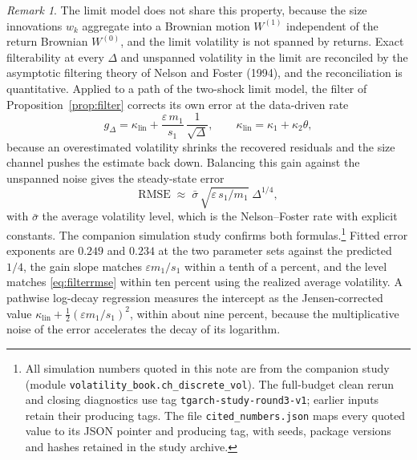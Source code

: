 \documentclass[11pt]{article}
\theoremstyle{remark}
\newtheorem{remark}[theorem]{Remark}
\newcommand{\Dt}{\Delta}
\begin{document}
\begin{remark}\label{rem:filtergap}
The limit model does not share this property, because the size innovations
$w_k$ aggregate into a Brownian motion $W^{(1)}$ independent of the return
Brownian $W^{(0)}$, and the limit volatility is not spanned by returns.
Exact filterability at every $\Dt$ and unspanned volatility in the limit
are reconciled by the asymptotic filtering theory of Nelson and Foster
(1994), and the reconciliation is quantitative.
Applied to a path of the two-shock limit model, the filter of
Proposition~\ref{prop:filter} corrects its own error at the data-driven
rate
\begin{equation}\label{eq:filterrate}
g_\Dt=\kappa_{\mathrm{lin}}
+\frac{\varepsilon\,m_1}{s_1}\,\frac{1}{\sqrt{\Dt}},
\qquad
\kappa_{\mathrm{lin}}=\kappa_1+\kappa_2\theta,
\end{equation}
because an overestimated volatility shrinks the recovered residuals and
the size channel pushes the estimate back down.
Balancing this gain against the unspanned noise gives the steady-state
error
\begin{equation}\label{eq:filterrmse}
\mathrm{RMSE}\;\approx\;\bar\sigma\,
\sqrt{\varepsilon\, s_1/m_1}\;\Dt^{1/4},
\end{equation}
with $\bar\sigma$ the average volatility level, which is the
Nelson--Foster rate with explicit constants.
The companion simulation study confirms both
formulas.\footnote{All simulation numbers quoted in this note are from the
companion study (module \texttt{volatility\_book.ch\_discrete\_vol}). The
full-budget clean rerun and closing diagnostics use tag
\texttt{tgarch-study-round3-v1}; earlier inputs retain their producing tags.
The file \texttt{cited\_numbers.json} maps every quoted value to its JSON
pointer and producing tag, with seeds, package versions and hashes retained
in the study archive.}
Fitted error exponents are $0.249$ and $0.234$ at the two parameter sets
against the predicted $1/4$, the gain slope matches
$\varepsilon m_1/s_1$ within a tenth of a percent, and the level matches
\eqref{eq:filterrmse} within ten percent using the realized average
volatility.
A pathwise log-decay regression measures the intercept as the
Jensen-corrected value
$\kappa_{\mathrm{lin}}+\tfrac{1}{2}(\varepsilon m_1/s_1)^2$, within about nine
percent, because the multiplicative noise of the error accelerates the
decay of its logarithm.
\end{remark}
\end{document}
